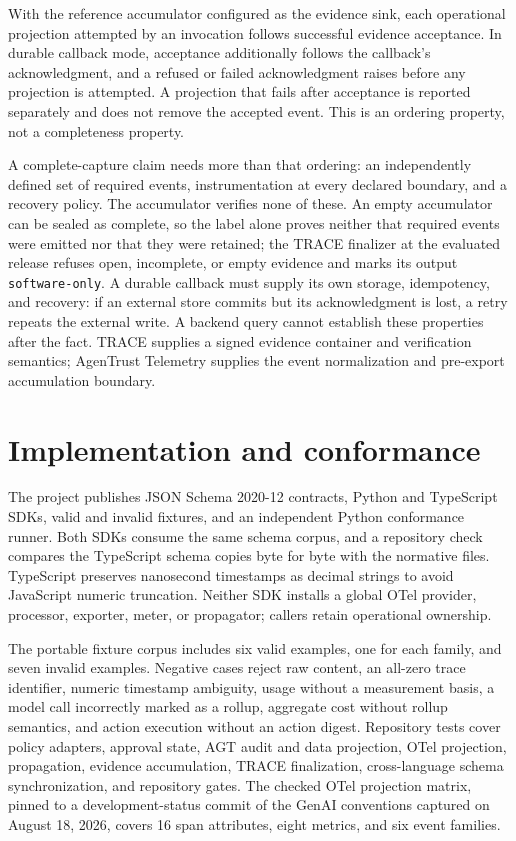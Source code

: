\documentclass[10pt,letterpaper]{article}
\begin{document}
With the reference accumulator configured as the evidence sink, each operational projection attempted by an invocation follows successful evidence acceptance. In durable callback mode, acceptance additionally follows the callback's acknowledgment, and a refused or failed acknowledgment raises before any projection is attempted. A projection that fails after acceptance is reported separately and does not remove the accepted event. This is an ordering property, not a completeness property.

A complete-capture claim needs more than that ordering: an independently defined set of required events, instrumentation at every declared boundary, and a recovery policy. The accumulator verifies none of these. An empty accumulator can be sealed as complete, so the label alone proves neither that required events were emitted nor that they were retained; the TRACE finalizer at the evaluated release refuses open, incomplete, or empty evidence and marks its output \texttt{software-only}. A durable callback must supply its own storage, idempotency, and recovery: if an external store commits but its acknowledgment is lost, a retry repeats the external write. A backend query cannot establish these properties after the fact. TRACE supplies a signed evidence container and verification semantics; AgenTrust Telemetry supplies the event normalization and pre-export accumulation boundary.

\section{Implementation and conformance}

The project publishes JSON Schema 2020-12 contracts, Python and TypeScript SDKs, valid and invalid fixtures, and an independent Python conformance runner. Both SDKs consume the same schema corpus, and a repository check compares the TypeScript schema copies byte for byte with the normative files. TypeScript preserves nanosecond timestamps as decimal strings to avoid JavaScript numeric truncation. Neither SDK installs a global OTel provider, processor, exporter, meter, or propagator; callers retain operational ownership.

The portable fixture corpus includes six valid examples, one for each family, and seven invalid examples. Negative cases reject raw content, an all-zero trace identifier, numeric timestamp ambiguity, usage without a measurement basis, a model call incorrectly marked as a rollup, aggregate cost without rollup semantics, and action execution without an action digest. Repository tests cover policy adapters, approval state, AGT audit and data projection, OTel projection, propagation, evidence accumulation, TRACE finalization, cross-language schema synchronization, and repository gates. The checked OTel projection matrix, pinned to a development-status commit of the GenAI conventions captured on August 18, 2026, covers 16 span attributes, eight metrics, and six event families.
\end{document}
